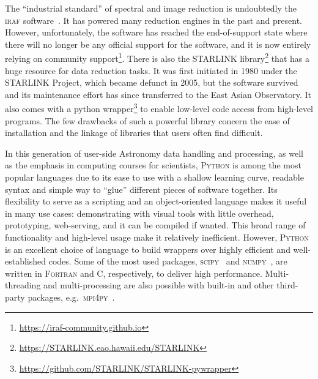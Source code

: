 \documentclass[twocolumn, linenumbers]{aastex631}
\begin{document}
The ``industrial standard'' of spectral and image reduction is undoubtedly
the \textsc{iraf} software~\citep{1986SPIE..627..733T, 1993ASPC...52..173T}.
It has powered many reduction engines in the past and present. However,
unfortunately, the software has reached the end-of-support state where there
will no longer be any official support for the software, and it is now
entirely relying on community support\footnote{\url{https://iraf-community.github.io}}.
There is also the \textsc{STARLINK}
library\footnote{\url{https://STARLINK.eao.hawaii.edu/STARLINK}}\citep{2014ASPC..485..391C, 2022ASPC..532..559B}
that has a huge resource for data reduction tasks. It was first initiated
in 1980 under the STARLINK Project, which became defunct in 2005, but the
software survived and its maintenance effort has since transferred to the
East Asian Observatory. It also comes with a python
wrapper\footnote{\url{https://github.com/STARLINK/STARLINK-pywrapper}}
to enable low-level code access from high-level programs. The few drawbacks
of such a powerful library concern the ease of installation and the
linkage of libraries that users often find difficult.

In this generation of user-side Astronomy data handling and processing, as
well as the emphasis in computing courses for scientists, \textsc{Python} is
among the most popular languages due to its ease to use with a shallow learning
curve, readable syntax and simple way to ``glue'' different pieces of software
together. Its flexibility to serve as a scripting and an object-oriented
language makes it useful in many use cases: demonstrating with visual tools
with little overhead, prototyping, web-serving, and it can be compiled if
wanted. This broad range of functionality and high-level usage make it
relatively inefficient. However, \textsc{Python} is an excellent choice of
language to build wrappers over highly efficient and well-established codes.
Some of the most used packages, \textsc{scipy}~\citep{2020SciPy-NMeth}
and \textsc{numpy}~\citep{2020NumPy-Array}, are written in \textsc{Fortran}
and \textsc{C}, respectively, to deliver high performance. Multi-threading
and multi-processing are also possible with built-in and other third-party
packages, e.g.\ \textsc{mpi4py}~\citep{DALCIN20111124}. 
\end{document}
